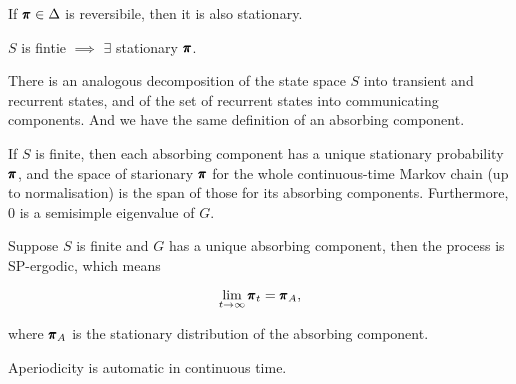 \begin{proposition}
    If $\pmb{\pi} \in \Delta$ is reversibile, then it is also stationary.
\end{proposition}

\begin{proposition}
    $S$ is fintie $\implies$ $\exists$ stationary $\pmb{\pi}$.
\end{proposition}

There is an analogous decomposition of the state space $S$ into transient and recurrent states, and of the set of recurrent states into communicating components. And we have the same definition of an absorbing component. 

\begin{proposition}
    If $S$ is finite, then each absorbing component has a unique stationary probability $\pmb{\pi}$, and the space of starionary $\pmb{\pi}$ for the whole continuous-time Markov chain (up to normalisation) is the span of those for its absorbing components. Furthermore, $0$ is a semisimple eigenvalue of $G$.
\end{proposition}

\begin{theorem}
    Suppose $S$ is finite and $G$ has a unique absorbing component, then the process is SP-ergodic, which means 

    \begin{equation*}
        \lim_{t \to \infty} \pmb{\pi}_t = \pmb{\pi}_A, 
    \end{equation*}

    where $\pmb{\pi}_A$ is the stationary distribution of the absorbing component.
\end{theorem}

\begin{remark}
    Aperiodicity is automatic in continuous time.
\end{remark}